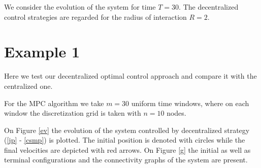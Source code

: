 \documentclass[a4paper,10pt, english]{article}
\begin{document}
We consider the evolution of the system for time $T = 30$. The decentralized control strategies are regarded for the radius of interaction $R = 2$.  
 \section{Example 1}
Here we test our decentralized optimal control approach and compare it with the centralized one. 
 
For the MPC algorithm we take  $m = 30$ uniform time windows, where  on each window the discretization grid
is taken with $n = 10$ nodes.  


On Figure \ref{ev} the evolution of the system  controlled by decentralized strategy (\ref{jp} - \ref{csmp}) is plotted. The initial position
is denoted with circles while the final velocities are depicted with red arrows. On Figure \ref{g} the initial as well as terminal configurations and the connectivity graphs of the system are present.
\end{document}
